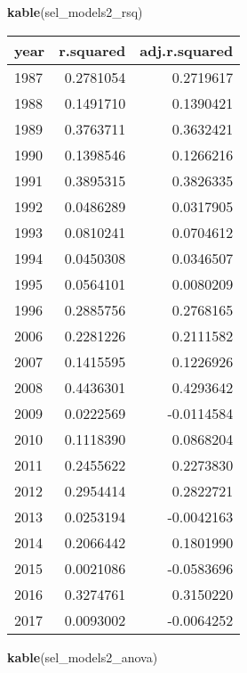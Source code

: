 \documentclass[]{article}
\newenvironment{Shaded}{\begin{snugshade}}{\end{snugshade}}
\newcommand{\KeywordTok}[1]{\textcolor[rgb]{0.13,0.29,0.53}{\textbf{#1}}}
\newcommand{\NormalTok}[1]{#1}
\begin{document}
\begin{Shaded}
\begin{Highlighting}[]
\KeywordTok{kable}\NormalTok{(sel_models2_rsq)}
\end{Highlighting}
\end{Shaded}

\begin{longtable}[]{@{}lrr@{}}
\toprule
year & r.squared & adj.r.squared\tabularnewline
\midrule
\endhead
1987 & 0.2781054 & 0.2719617\tabularnewline
1988 & 0.1491710 & 0.1390421\tabularnewline
1989 & 0.3763711 & 0.3632421\tabularnewline
1990 & 0.1398546 & 0.1266216\tabularnewline
1991 & 0.3895315 & 0.3826335\tabularnewline
1992 & 0.0486289 & 0.0317905\tabularnewline
1993 & 0.0810241 & 0.0704612\tabularnewline
1994 & 0.0450308 & 0.0346507\tabularnewline
1995 & 0.0564101 & 0.0080209\tabularnewline
1996 & 0.2885756 & 0.2768165\tabularnewline
2006 & 0.2281226 & 0.2111582\tabularnewline
2007 & 0.1415595 & 0.1226926\tabularnewline
2008 & 0.4436301 & 0.4293642\tabularnewline
2009 & 0.0222569 & -0.0114584\tabularnewline
2010 & 0.1118390 & 0.0868204\tabularnewline
2011 & 0.2455622 & 0.2273830\tabularnewline
2012 & 0.2954414 & 0.2822721\tabularnewline
2013 & 0.0253194 & -0.0042163\tabularnewline
2014 & 0.2066442 & 0.1801990\tabularnewline
2015 & 0.0021086 & -0.0583696\tabularnewline
2016 & 0.3274761 & 0.3150220\tabularnewline
2017 & 0.0093002 & -0.0064252\tabularnewline
\bottomrule
\end{longtable}

\begin{Shaded}
\begin{Highlighting}[]
\KeywordTok{kable}\NormalTok{(sel_models2_anova)}
\end{Highlighting}
\end{Shaded}
\end{document}
